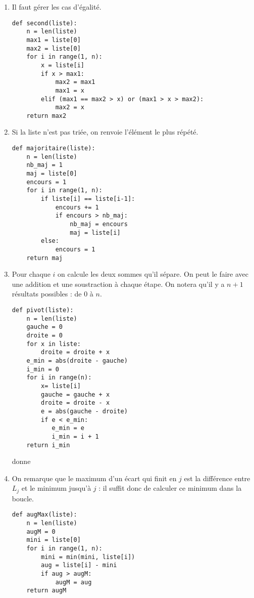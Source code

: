 \begin{Answer} 
\begin{enumerate}
\item Il faut gérer les cas d'égalité.
\begin{lstlisting}
def second(liste):
    n = len(liste)
    max1 = liste[0]
    max2 = liste[0]
    for i in range(1, n):
        x = liste[i]
        if x > max1:
            max2 = max1
            max1 = x
        elif (max1 == max2 > x) or (max1 > x > max2):
            max2 = x
    return max2
\end{lstlisting}

\item Si la liste n'est pas triée, on renvoie l'élément le plus répété.
\begin{lstlisting}
def majoritaire(liste):
    n = len(liste)
    nb_maj = 1
    maj = liste[0]
    encours = 1
    for i in range(1, n):
        if liste[i] == liste[i-1]:
            encours += 1
            if encours > nb_maj:
                nb_maj = encours
                maj = liste[i]
        else:
            encours = 1
    return maj
\end{lstlisting}

\item Pour chaque $i$ on calcule les deux sommes qu'il sépare. On peut le faire avec une addition et une soustraction à chaque étape. On notera qu'il y a $n+1$ résultats possibles : de 0 à $n$.
\begin{lstlisting}
def pivot(liste):
    n = len(liste)
    gauche = 0
    droite = 0
    for x in liste:
        droite = droite + x
    e_min = abs(droite - gauche)
    i_min = 0
    for i in range(n):
        x= liste[i]
        gauche = gauche + x
        droite = droite - x
        e = abs(gauche - droite)
        if e < e_min:
           e_min = e
           i_min = i + 1
    return i_min
\end{lstlisting}
 donne 

\newpage

\item On remarque que le maximum d'un écart qui finit en $j$ est la différence entre $L_j$ et le minimum jusqu'à $j$ : il suffit donc de calculer ce minimum dans la boucle.
\begin{lstlisting}
def augMax(liste):
    n = len(liste)
    augM = 0
    mini = liste[0]
    for i in range(1, n):
        mini = min(mini, liste[i])
        aug = liste[i] - mini
        if aug > augM:
            augM = aug
    return augM
\end{lstlisting}


\end{enumerate}
\end{Answer}

